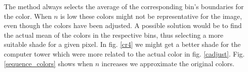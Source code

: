 \documentclass[a4paper, 10pt, final]{article}
\begin{document}
The method always selects the average of the corresponding bin's
boundaries for the color. When $n$ is low these colors might not be
representative for the image, even though the colors have been adjusted.
A possible solution would be to find the actual mean of the colors in
the respective bins, thus selecting a more suitable shade for a given
pixel. In fig. \ref{cr4} we might get a better shade for the computer
tower which were more related to the actual color in fig.
\ref{cadjust}. Fig. \ref{sequence_colors} shows when $n$ increases we
approximate the original colors.

\begin{figure}[!h]
    \centering
    \\
    \\

\end{figure}
\end{document}
